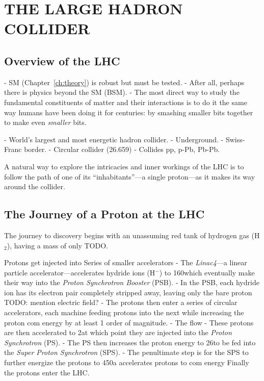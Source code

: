 \chapter{THE LARGE HADRON COLLIDER}

\section{Overview of the LHC}
- SM (Chapter~\ref{ch:theory}) is robust but must be tested.
- After all, perhaps there is physics beyond the SM (BSM).
- The most direct way to study the fundamental constituents of matter and their interactions is to do it the same way humans have been doing it for centuries:
by smashing smaller bits together to make even \emph{smaller} bits.

- World's largest and most energetic hadron collider.
- Underground.
- Swiss-Franc border.
- Circular collider (26.659\Km)
- Collides pp, p-Pb, Pb-Pb.

A natural way to explore the intricacies and inner workings of the LHC is to follow the path of one of its ``inhabitants''---a single proton---as it makes its way around the collider.

\section{The Journey of a Proton at the LHC}
The journey to discovery begins with an unassuming red tank of hydrogen gas (H$_2$), having a mass of only TODO\Kg.

Protons get injected into Series of smaller accelerators
    - The \emph{Linac4}---a linear particle accelerator---accelerates hydride ions (H$^-$) to 160\MeV which eventually make their way into the \emph{Proton Synchrotron Booster} (PSB).
    - In the PSB, each hydride ion has its electron pair completely stripped away, leaving only the bare proton TODO: mention electric field?
    - The protons then enter a series of circular accelerators, each machine feeding protons into the next while increasing the proton com energy by at least 1 order of magnitude.
    - The flow 
    - These protons are then accelerated to 2\GeV at which point they are injected into the \emph{Proton Synchrotron} (PS).
    - The PS then increases the proton energy to 26\GeV to be fed into the \emph{Super Proton Synchrotron} (SPS).
    - The penultimate step is for the SPS to further energize the protons to 450\GeV a accelerates protons to com energy
Finally the protons enter the LHC.

